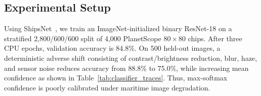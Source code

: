 \documentclass[10pt, conference]{IEEEtran}
\begin{document}
\subsection{Experimental Setup}
Using ShipsNet~\cite{shipsnet_kaggle}, we train an ImageNet-initialized binary ResNet-18 on a stratified 2,800/600/600 split of 4,000 PlanetScope $80\times80$ chips. After three CPU epochs, validation accuracy is 84.8\%. On 500 held-out images, a deterministic adverse shift consisting of contrast/brightness reduction, blur, haze, and sensor noise reduces accuracy from 88.8\% to 75.0\%, while increasing mean confidence as shown in Table~\ref{tab:classifier_traces}. Thus, max-softmax confidence is poorly calibrated under maritime image degradation.

\begin{table}[t]
\centering
\caption{Held-out ShipsNet confidence traces}
\label{tab:classifier_traces}
\end{table}
\end{document}
